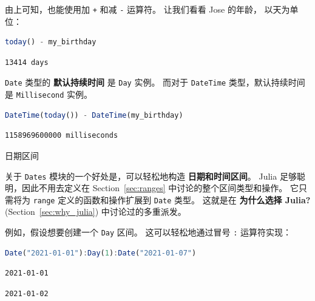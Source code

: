 \documentclass[
  notoc %
]{tufte-book}
\makeatletter
\newcommand{\passthrough}[1]{#1}
\renewcommand\subsubsection{%
\@startsection{subsubsection}{3}{\z@ }{-3.25ex\@plus -1ex \@minus -.2ex}{1.5ex \@plus .2ex}{\normalfont \normalsize \bfseries }
}
\makeatother
\begin{document}
由上可知，也能使用加 \passthrough{\lstinline!+!} 和减
\passthrough{\lstinline!-!} 运算符。 让我们看看 Jose 的年龄，
以天为单位：

\begin{lstlisting}[language=Julia]
today() - my_birthday
\end{lstlisting}

\begin{lstlisting}[language=Output]
13414 days
\end{lstlisting}

\passthrough{\lstinline!Date!} 类型的 \textbf{默认持续时间} 是
\passthrough{\lstinline!Day!} 实例。 而对于
\passthrough{\lstinline!DateTime!} 类型，默认持续时间是
\passthrough{\lstinline!Millisecond!} 实例。

\begin{lstlisting}[language=Julia]
DateTime(today()) - DateTime(my_birthday)
\end{lstlisting}

\begin{lstlisting}[language=Output]
1158969600000 milliseconds
\end{lstlisting}

\hypertarget{sec:dates_intervals}{%
\subsubsection{日期区间}\label{sec:dates_intervals}}

关于 \passthrough{\lstinline!Dates!} 模块的一个好处是，可以轻松地构造
\textbf{日期和时间区间}。 Julia 足够聪明，因此不用去定义在
Section~\ref{sec:ranges} 中讨论的整个区间类型和操作。 它只需将为
\passthrough{\lstinline!range!} 定义的函数和操作扩展到
\passthrough{\lstinline!Date!} 类型。 这就是在 \textbf{为什么选择
Julia?} (Section~\ref{sec:why_julia}) 中讨论过的多重派发。

例如，假设想要创建一个 \passthrough{\lstinline!Day!} 区间。
这可以轻松地通过冒号 \passthrough{\lstinline!:!} 运算符实现：

\begin{lstlisting}[language=Julia]
Date("2021-01-01"):Day(1):Date("2021-01-07")
\end{lstlisting}

\begin{lstlisting}[language=Output]
2021-01-01
\end{lstlisting}

\begin{lstlisting}[language=Output]
2021-01-02
\end{lstlisting}
\end{document}

